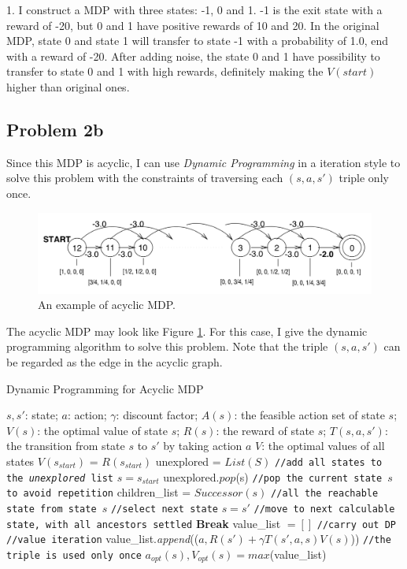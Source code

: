 \documentclass[paper=a4, fontsize=10pt]{scrartcl} %
\numberwithin{equation}{section} %
\numberwithin{figure}{section} %
\numberwithin{table}{section} %
\begin{document}
\begin{spacing}{1.}
I construct a MDP with three states: -1, 0 and 1. -1 is the exit state with a reward of -20, but 0 and 1 have positive rewards of 10 and 20. In the original MDP, state 0 and state 1 will transfer to state -1 with a probability of 1.0, end with a reward of -20. After adding noise, the state 0 and 1 have possibility to transfer to state 0 and 1 with high rewards, definitely making the $V(start)$ higher than original ones.

\subsection{Problem 2b}
Since this MDP is acyclic, I can use \textit{Dynamic Programming} in a iteration style to solve this problem with the constraints of traversing each $(s, a, s')$ triple only once.

\begin{figure}[!htp]
\centering 
\includegraphics[width=10 cm]{picture/acyclic_MDP}
\caption{An example of acyclic MDP.}
\label{fig:acy_MDP} 
\end{figure}

The acyclic MDP may look like Figure \ref{fig:acy_MDP}. For this case, I give the dynamic programming algorithm to solve this problem. Note that the triple $(s, a, s')$ can be regarded as the edge in the acyclic graph.

\begin{algorithm}[h]
\caption{Dynamic Programming for Acyclic MDP} 
\label{alg::DP_acy} 
\begin{algorithmic}[1]
{
\Require
$s, s'$: state;
$a$: action;
$\gamma$: discount factor;
$A(s)$: the feasible action set of state $s$;
$V(s)$: the optimal value of state $s$;
$R(s)$: the reward of state $s$;
$T(s, a, s')$: the transition from state $s$ to $s'$ by taking action $a$
\Ensure
$V$: the optimal values of all states
\State $V(s_{start})$ = $R(s_{start})$
\State unexplored = $List(S)$    \texttt{//add all states to the \textit{unexplored} list}
\State $s = s_{start}$
	\State unexplored.$pop$(s)    \texttt{//pop the current state $s$ to avoid repetition}
	\State children\_list = $Successor(s)$    \texttt{//all the reachable state from state $s$}
	    \texttt{//select next state}
			\State $s = s'$    \texttt{//move to next calculable state, with all ancestors settled}
			\State \textbf{Break}
		\EndIf
	\EndFor
	\State value\_list $= []$    \texttt{//carry out DP}
	    \texttt{//value iteration}
		\State value\_list.\textit{append}(($a, R(s') + \gamma T(s', a, s)V(s)$)) \texttt{//the triple is used only once}
	\EndFor
	\State $a_{opt}(s), V_{opt}(s) = max$(value\_list)
\EndWhile
}
\end{algorithmic} 
\end{algorithm}


\end{spacing}
\end{document}
